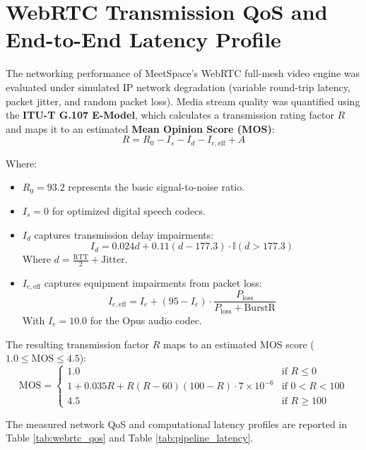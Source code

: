 \documentclass[12pt,oneside,letterpaper]{report}
\numberwithin{equation}{chapter} %
\begin{document}
\section{WebRTC Transmission QoS and End-to-End Latency Profile}
The networking performance of MeetSpace's WebRTC full-mesh video engine was evaluated under simulated IP network degradation (variable round-trip latency, packet jitter, and random packet loss). Media stream quality was quantified using the \textbf{ITU-T G.107 E-Model}, which calculates a transmission rating factor $R$ and maps it to an estimated \textbf{Mean Opinion Score (MOS)}:
\begin{equation}
R = R_0 - I_s - I_d - I_{e,\text{eff}} + A
\label{eq:emodel_r}
\end{equation}

Where:
\begin{itemize}
    \item $R_0 = 93.2$ represents the basic signal-to-noise ratio.
    \item $I_s = 0$ for optimized digital speech codecs.
    \item $I_d$ captures transmission delay impairments:
    \begin{equation}
    I_d = 0.024 d + 0.11 (d - 177.3) \cdot \mathbb{I}(d > 177.3)
    \label{eq:delay_impairment}
    \end{equation}
    Where $d = \frac{\text{RTT}}{2} + \text{Jitter}$.
    \item $I_{e,\text{eff}}$ captures equipment impairments from packet loss:
    \begin{equation}
    I_{e,\text{eff}} = I_e + (95 - I_e) \cdot \frac{P_{\text{loss}}}{P_{\text{loss}} + \text{BurstR}}
    \label{eq:packet_loss_impairment}
    \end{equation}
    With $I_e = 10.0$ for the Opus audio codec.
\end{itemize}

The resulting transmission factor $R$ maps to an estimated MOS score ($1.0 \le \text{MOS} \le 4.5$):
\begin{equation}
\text{MOS} = \begin{cases} 
1.0 & \text{if } R \le 0 \\
1 + 0.035 R + R(R - 60)(100 - R) \cdot 7 \times 10^{-6} & \text{if } 0 < R < 100 \\
4.5 & \text{if } R \ge 100 
\end{cases}
\label{eq:mos_mapping}
\end{equation}

The measured network QoS and computational latency profiles are reported in Table \ref{tab:webrtc_qos} and Table \ref{tab:pipeline_latency}.
\end{document}

